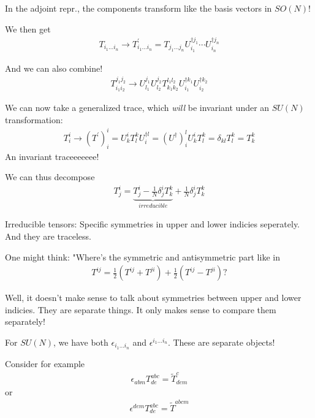 In the adjoint repr., the components transform like the basis vectors in \(SO(N)\)!

We then get \begin{align*}
    T_{i_1 \dots i_ n} \to T^{\prime} _{i_1 \dots i_n} = T_{j_1 \dots j_n} U^{\dagger j_1}_{i_1} \cdots U^{\dagger j_n}_{i_n} 
\end{align*}

And we can also combine!\begin{align*}
    T^{j_1 j_2}_{i_1 i_2} \to U^{j_1}_{l_1} U^{j_2} _{l_2} T^{l_1 l_2} _{k_1 k_2} U^{\dagger k_1}_{i_{1} } U^{\dagger k_2}_{i_2}  
\end{align*}

We can now take a generalized trace, which \textit{will} be invariant under an \(SU(N)\) transformation: \begin{align*}
    T^i _ i \to \left( T^{\prime}  \right) ^i _i = U^i _k T ^k _ l U^{\dagger l }_ i = \left( U^{\dagger} \right)^l _ i U ^i _k T^k _l = \delta_{kl} T ^k _ l = T^k _ k  
\end{align*}
An invariant traceeeeeee!

We can thus decompose \begin{align*}
    T^i _j = \underbrace{T^i _j - \frac{1}{N}\delta^i _ j T^k _k}_{irreducible} + \frac{1}{N}\delta ^i _ j T ^k _ k 
\end{align*}

Irreducible tensors: Specific symmetries in upper and lower indicies seperately. And they are traceless.

\begin{remark}
    One might think: "Where's the symmetric and antisymmetric part like in \begin{align*}
        T^{ij} = \frac{1}{2}\left( T^{ij} + T^{ji}  \right) + \frac{1}{2} \left( T^{ij} - T^{ji}   \right) ?
    \end{align*}

    Well, it doesn't make sense to talk about symmetries between upper and lower indicies. They are separate things. It only makes sense to compare them separately!
\end{remark}

For \(SU(N)\), we have both \(\epsilon _{i_1 \dots i_n}\) and \(\epsilon ^{i_1 \dots i_n}\). These are separate objects!

Consider for example \begin{align*}
    \epsilon _{abm}T^{abc} _{de} = \tilde{T}^c _{d e m }
\end{align*}
or \begin{align*}
    \epsilon ^{dem} T^{abc} _{de} = \tilde{T}^{abcm}
\end{align*}

